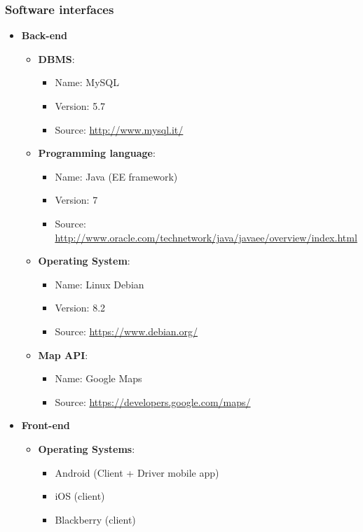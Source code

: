\subsubsection{Software interfaces}
\begin{itemize}
\item \textbf{Back-end}
\begin{itemize}
	\item \textbf{DBMS}:
	\begin{itemize}
		\item Name: MySQL
		\item Version: 5.7
		\item Source: \url{http://www.mysql.it/}
	\end{itemize}
	
	\item \textbf{Programming language}:
	\begin{itemize}
		\item Name: Java (EE framework)
		\item Version: 7
		\item Source: \url{http://www.oracle.com/technetwork/java/javaee/overview/index.html}
	\end{itemize}
	
	\item \textbf{Operating System}:
	\begin{itemize}
		\item Name: Linux Debian
		\item Version: 8.2
		\item Source: \url{https://www.debian.org/}
	\end{itemize}	
	
	\item \textbf{Map API}:
	\begin{itemize}
		\item Name: Google Maps
		\item Source: \url{https://developers.google.com/maps/}
	\end{itemize}	
\end{itemize}

\item \textbf{Front-end}
\begin{itemize}
\item \textbf{Operating Systems}:
	\begin{itemize}
		\item Android (Client + Driver mobile app)
		\item iOS (client)
		\item Blackberry (client)
	\end{itemize}
\end{itemize}
\end{itemize}

